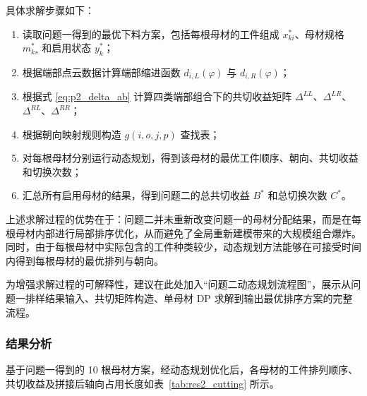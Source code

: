 \documentclass[UTF8]{ctexart}
\begin{document}
具体求解步骤如下：

\begin{enumerate}
    \item 读取问题一得到的最优下料方案，包括每根母材的工件组成 $x_{ki}^*$、母材规格 $m_{ks}^*$ 和启用状态 $y_k^*$；
    \item 根据端部点云数据计算端部缩进函数 $d_{i,L}(\varphi)$ 与 $d_{i,R}(\varphi)$；
    \item 根据式 \eqref{eq:p2_delta_ab} 计算四类端部组合下的共切收益矩阵 $\Delta^{LL}$、$\Delta^{LR}$、$\Delta^{RL}$、$\Delta^{RR}$；
    \item 根据朝向映射规则构造 $g(i,o,j,p)$ 查找表；
    \item 对每根母材分别运行动态规划，得到该母材的最优工件顺序、朝向、共切收益和切换次数；
    \item 汇总所有启用母材的结果，得到问题二的总共切收益 $B^*$ 和总切换次数 $C^*$。
\end{enumerate}

上述求解过程的优势在于：问题二并未重新改变问题一的母材分配结果，而是在每根母材内部进行局部排序优化，从而避免了全局重新建模带来的大规模组合爆炸。同时，由于每根母材中实际包含的工件种类较少，动态规划方法能够在可接受时间内得到每根母材的最优排列与朝向。

为增强求解过程的可解释性，建议在此处加入“问题二动态规划流程图”，展示从问题一排样结果输入、共切矩阵构造、单母材 DP 求解到输出最优排序方案的完整流程。

\subsubsection{结果分析}

基于问题一得到的 10 根母材方案，经动态规划优化后，各母材的工件排列顺序、共切收益及拼接后轴向占用长度如表~\ref{tab:res2_cutting} 所示。
\end{document}
